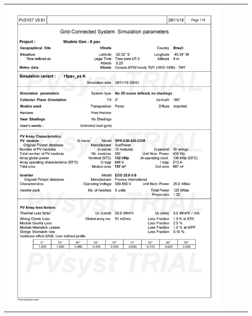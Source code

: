 \begin{table}[H]
    \centering
    \begin{tabular}{l}
        \includegraphics[width=0.9\textwidth]{figures/attachments/resultpv31.jpg}
    \end{tabular}
\end{table}
\pagebreak
